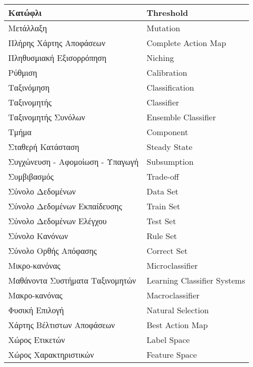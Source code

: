 \begin{center}
\begin{longtable}{ll}
Κατώφλι & Threshold												\\ \hline
Μετάλλαξη & Mutation											\\ \hline
Πλήρης Χάρτης Αποφάσεων & Complete Action Map					\\ \hline
Πληθυσμιακή Εξισορρόπηση & Niching								\\ \hline
Ρύθμιση & Calibration											\\ \hline
Ταξινόμηση & Classification										\\ \hline
Ταξινομητής & Classifier										\\ \hline
Ταξινομητής Συνόλων & Ensemble Classifier						\\ \hline
Τμήμα & Component												\\ \hline
Σταθερή Κατάσταση & Steady State								\\ \hline
Συγχώνευση - Αφομοίωση - Υπαγωγή & Subsumption					\\ \hline
Συμβιβασμός & Trade-off											\\ \hline
Σύνολο Δεδομένων & Data Set										\\ \hline
Σύνολο Δεδομένων Εκπαίδευσης & Train Set						\\ \hline
Σύνολο Δεδομένων Ελέγχου & Test Set								\\ \hline
Σύνολο Κανόνων & Rule Set										\\ \hline
Σύνολο Ορθής Απόφασης	& Correct Set							\\ \hline
Μικρο-κανόνας & Microclassifier									\\ \hline
Μαθάνοντα Συστήματα Ταξινομητών & Learning Classifier Systems 	\\ \hline
Μακρο-κανόνας & Macroclassifier									\\ \hline
Φυσική Επιλογή & Natural Selection								\\ \hline
Χάρτης Βέλτιστων Αποφάσεων & Best Action Map					\\ \hline
Χώρος Ετικετών & Label Space									\\ \hline
Χώρος Χαρακτηριστικών & Feature Space							\\ \hline
\end{longtable}
\end{center}
